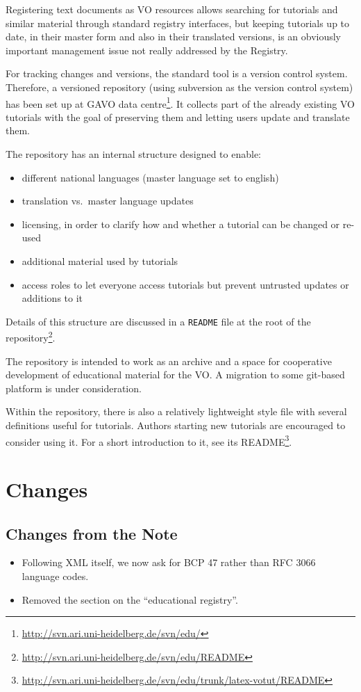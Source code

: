 \documentclass{ivoa}
\begin{document}
\label{sect:svn-repo}

Registering text documents as VO resources allows searching for tutorials
and similar
material through standard registry interfaces, but keeping
tutorials up to date, in their master form and also in their translated
versions, is an obviously important management issue not really
addressed by the Registry.

For tracking changes and versions, the standard tool is a version
control system.  Therefore,
a versioned repository (using subversion as the version control system)
has been set up at GAVO data
centre\footnote{\url{http://svn.ari.uni-heidelberg.de/svn/edu/}}.
It collects part of the
already existing VO tutorials with the goal of preserving them and
letting users
update and translate them.

The repository has an internal structure designed to enable:

\begin{itemize}

\item different national languages (master language set to english){}

\item translation vs.~master language updates{}

\item licensing, in order to clarify how and whether a tutorial can be changed or re-used{}

\item additional material used by tutorials

\item access roles to let everyone access tutorials but prevent untrusted updates or additions to it

\end{itemize}

Details of this structure are discussed in a \texttt{README} file at the
root of the
repository\footnote{\url{http://svn.ari.uni-heidelberg.de/svn/edu/README}}.

The repository is intended to work as an archive and a space for cooperative
development of educational material for the VO.  A migration to some
git-based platform is under consideration.

Within the repository, there is also a relatively lightweight style file
with several definitions useful for tutorials.  Authors starting new
tutorials are encouraged to consider using it.  For a short introduction
to it, see its README\footnote{\url{http://svn.ari.uni-heidelberg.de/svn/edu/trunk/latex-votut/README}}.



\section{Changes}

\subsection{Changes from the Note}

\begin{itemize}
\item Following XML itself, we now ask for BCP 47 rather than RFC
3066 language codes.
\item Removed the section on the ``educational registry''.
\end{itemize}


\end{document}
